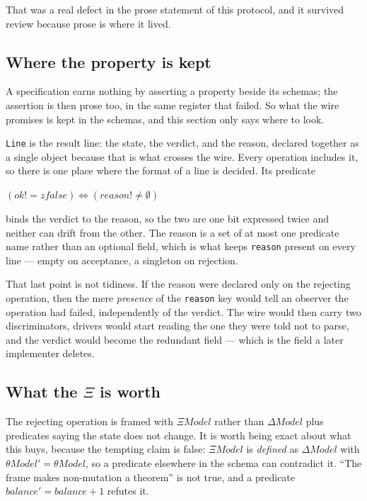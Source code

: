 \documentclass[a4paper,10pt,fleqn]{article}
\begin{document}
That was a real defect in the prose statement of this protocol, and it
survived review because prose is where it lived.

\subsection{Where the property is kept}

A specification earns nothing by asserting a property beside its schemas;
the assertion is then prose too, in the same register that failed. So
what the wire promises is kept in the schemas, and this section only says
where to look.

\texttt{Line} is the result line: the state, the verdict, and the reason,
declared together as a single object because that is what crosses the
wire. Every operation includes it, so there is one place where the format
of a line is decided. Its predicate

\begin{center}
  $(ok! = zfalse) \iff (reason! \neq \emptyset)$
\end{center}

binds the verdict to the reason, so the two are one bit expressed twice
and neither can drift from the other. The reason is a set of at most one
predicate name rather than an optional field, which is what keeps
\texttt{reason} present on every line --- empty on acceptance, a
singleton on rejection.

That last point is not tidiness. If the reason were declared only on the
rejecting operation, then the mere \emph{presence} of the \texttt{reason}
key would tell an observer the operation had failed, independently of the
verdict. The wire would then carry two discriminators, drivers would
start reading the one they were told not to parse, and the verdict would
become the redundant field --- which is the field a later implementer
deletes.

\subsection{What the $\Xi$ is worth}

The rejecting operation is framed with $\Xi Model$ rather than
$\Delta Model$ plus predicates saying the state does not change. It is
worth being exact about what this buys, because the tempting claim is
false: $\Xi Model$ is \emph{defined} as $\Delta Model$ with
$\theta Model' = \theta Model$, so a predicate elsewhere in the schema
can contradict it. ``The frame makes non-mutation a theorem'' is not
true, and a predicate $balance' = balance + 1$ refutes it.
\end{document}
